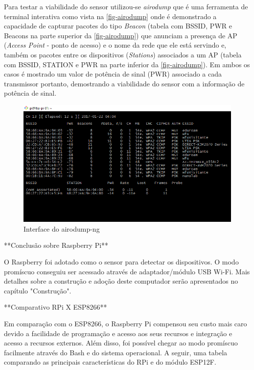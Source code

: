 Para testar a viabilidade do sensor utilizou-se \emph{airodump} que é uma
ferramenta de terminal interativa como vista na \autoref{fig-airodump} onde é
demonstrado a capacidade de capturar pacotes do tipo \emph{Beacon} (tabela com
BSSID, PWR e Beacons na parte superior da \autoref{fig-airodump}) que anunciam
a presença de AP (\emph{Access Point} - ponto de acesso) e o nome da rede que
ele está servindo e, também os pacotes entre os dispositivos (\emph{Stations})
associados a um AP (tabela com BSSID, STATION e PWR na parte inferior da
\autoref{fig-airodump}). Em ambos os casos é mostrado um valor de potência de
sinal (PWR) associado a cada transmissor portanto, demostrando a viabilidade
do sensor com a informação de potência de sinal.

\begin{figure}[htb]
	\caption{\label{fig-airodump}Interface do airodump-ng}
	\begin{center}
	\includegraphics[width=1\textwidth]{040-plataformas/RPi-WiFi-dongles/wifi-sniff-rpi/4-rpi-airodump.png}
	\end{center}
\end{figure}


**Conclusão sobre Raspberry Pi**

O Raspberry foi adotado como o sensor para detectar os dispositivos. O modo
promíscuo conseguiu ser acessado através de adaptador/módulo USB Wi-Fi. Mais
detalhes sobre a construção e adoção deste computador serão apresentados no
capítulo "Construção".

**Comparativo RPi X ESP8266**

Em comparação com o ESP8266, o Raspberry Pi compensou seu custo mais caro devido
a facilidade de programação e acesso aos seus recursos e integração e acesso a
recursos externos. Além disso, foi possível chegar ao modo promíscuo facilmente
através do Bash e do sistema operacional. A seguir, uma tabela comparando as
principais características do RPi e do módulo ESP12F.

